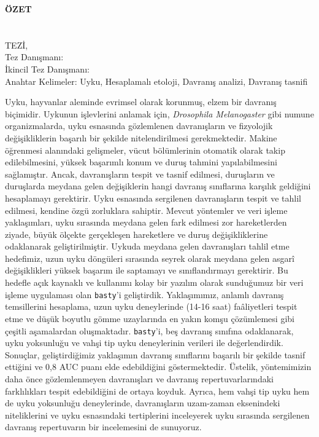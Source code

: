 \clearpage\pagebreak
\begin{center}
	\MakeUppercase{\textbf{Özet}} \\ [3\baselineskip]
	\MakeUppercase{\thesistitletr} \\ [3\baselineskip]
	\MakeUppercase{\student} \\[\baselineskip]
	\MakeUppercase{\majortr \degreetr Tez\.{ı}, \monthtr~\year} \\[\baselineskip]
	Tez Danışmanı: \advisortr \\
	İkincil Tez Danışmanı: \coadvisortr \\
	[2\baselineskip]
	Anahtar Kelimeler: Uyku, Hesaplamalı etoloji, Davranış analizi, Davranış tasnifi
\end{center}

\singlespacing

Uyku, hayvanlar aleminde evrimsel olarak korunmuş, elzem bir davranış biçimidir.
Uykunun işlevlerini anlamak için, \textit{Drosophila Melanogaster} gibi numune organizmalarda, uyku esnasında gözlemlenen davranışların ve fizyolojik değişikliklerin başarılı bir şekilde nitelendirilmesi gerekmektedir.
Makine öğrenmesi alanındaki gelişmeler, vücut bölümlerinin otomatik olarak takip edilebilmesini, yüksek başarımlı konum ve duruş tahmini yapılabilmesini sağlamıştır.
Ancak, davranışların tespit ve tasnif edilmesi, duruşların ve duruşlarda meydana gelen değişiklerin hangi davranış sınıflarına karşılık geldiğini hesaplamayı gerektirir.
Uyku esnasında sergilenen davranışların tespit ve tahlil edilmesi, kendine özgü zorluklara sahiptir.
Mevcut yöntemler ve veri işleme yaklaşımları, uyku sırasında meydana gelen fark edilmesi zor hareketlerden ziyade, büyük ölçekte gerçekleşen hareketlere ve duruş değişikliklerine odaklanarak geliştirilmiştir.
Uykuda meydana gelen davranışları tahlil etme hedefimiz, uzun uyku döngüleri sırasında seyrek olarak meydana gelen asgarî değişiklikleri yüksek başarım ile saptamayı ve sınıflandırmayı gerektirir.
Bu hedefle açık kaynaklı ve kullanımı kolay bir yazılım olarak sunduğumuz bir veri işleme uygulaması olan \texttt{basty}’i geliştirdik.
Yaklaşımımız, anlamlı davranış temsillerini hesaplama, uzun uyku deneylerinde (14-16 saat) faâliyetleri tespit etme ve düşük boyutlu gömme uzaylarında en yakın komşu çözümlemesi gibi çeşitli aşamalardan oluşmaktadır.
\texttt{basty}'i, beş davranış sınıfına odaklanarak, uyku yoksunluğu ve vahşi tip uyku deneylerinin verileri ile değerlendirdik.
Sonuçlar, geliştirdiğimiz yaklaşımın davranış sınıflarını başarılı bir şekilde tasnif ettiğini ve 0,8 AUC puanı elde edebildiğini göstermektedir.
Üstelik, yöntemimizin daha önce gözlemlenmeyen davranışları ve davranış repertuvarlarındaki farklılıkları tespit edebildiğini de ortaya koyduk.
Ayrıca, hem vahşi tip uyku hem de uyku yoksunluğu deneylerinde, davranışların uzam-zaman eksenindeki niteliklerini ve uyku esnasındaki tertiplerini inceleyerek uyku sırasında sergilenen davranış repertuvarın bir incelemesini de sunuyoruz.

\onehalfspacing

